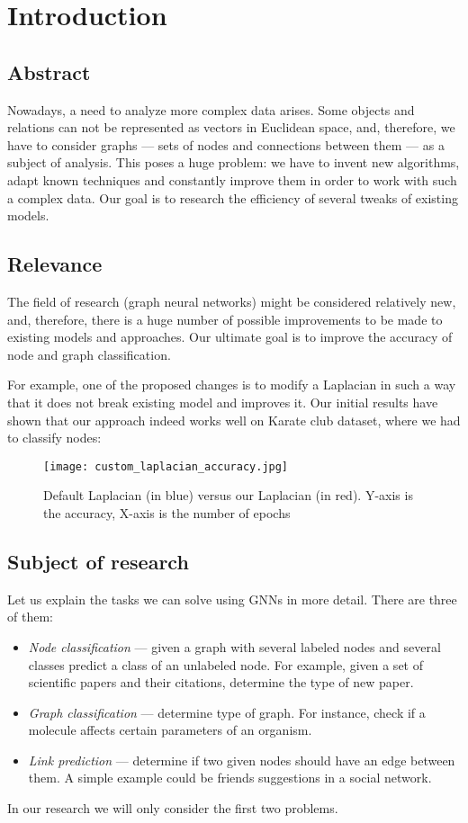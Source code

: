 \section{Introduction}

\subsection{Abstract}
    Nowadays, a need to analyze more complex data arises.
    Some objects and relations can not be represented as vectors in Euclidean space, and, therefore, we have to consider graphs --- sets of nodes and connections between them --- as a subject of analysis.
    This poses a huge problem: we have to invent new algorithms, adapt known techniques and constantly improve them in order to work with such a complex data.
    Our goal is to research the efficiency of several tweaks of existing models. 
    
\subsection{Relevance}
    The field of research (graph neural networks) might be considered relatively new, and, therefore, there is a huge number of possible improvements to be made to existing models and approaches.
    Our ultimate goal is to improve the accuracy of node and graph classification.

    For example, one of the proposed changes is to modify a Laplacian in such a way that it does not break existing model and improves it.
    Our initial results have shown that our approach indeed works well on Karate club dataset, where we had to classify nodes:

    \begin{figure}[h]
        \centering
        \texttt{[image: custom\_laplacian\_accuracy.jpg]}
        \caption{Default Laplacian (in blue) versus our Laplacian (in red). Y-axis is the accuracy, X-axis is the number of epochs}
    \end{figure}

\subsection{Subject of research}
    Let us explain the tasks we can solve using GNNs in more detail.
    There are three of them:
    \begin{itemize}
        \item \textit{Node classification} --- given a graph with several labeled nodes and several classes predict a class of an unlabeled node.
            For example, given a set of scientific papers and their citations, determine the type of new paper.
        \item \textit{Graph classification} --- determine type of graph.
            For instance, check if a molecule affects certain parameters of an organism.
        \item \textit{Link prediction} --- determine if two given nodes should have an edge between them.
            A simple example could be friends suggestions in a social network.
    \end{itemize}
    In our research we will only consider the first two problems.

